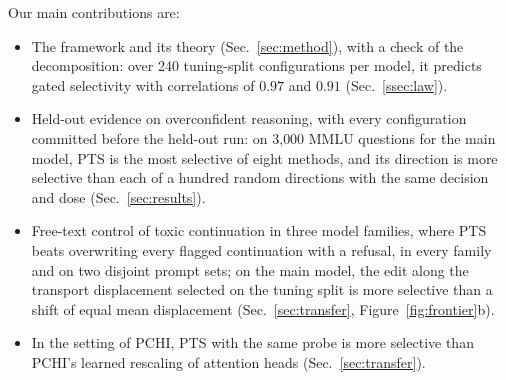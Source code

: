 \documentclass{article}
\begin{document}
Our main contributions are:
\begin{itemize}\setlength{\itemsep}{1pt}
\item The framework and its theory (Sec.~\ref{sec:method}), with a check of
the decomposition: over 240 tuning-split configurations per model, it predicts
gated selectivity with correlations of $0.97$ and $0.91$
(Sec.~\ref{ssec:law}).
\item Held-out evidence on overconfident reasoning, with every configuration
committed before the held-out run: on 3{,}000 MMLU questions for the main model,
PTS is the most selective of eight methods, and its direction is more selective
than each of a hundred random directions with the same decision and dose
(Sec.~\ref{sec:results}).
\item Free-text control of toxic continuation in three model families, where
PTS beats overwriting every flagged continuation with a refusal, in every
family and on two disjoint prompt sets; on the main model, the edit along the
transport displacement selected on the tuning split is more selective than a
shift of equal mean displacement (Sec.~\ref{sec:transfer},
Figure~\ref{fig:frontier}b).
\item In the setting of PCHI, PTS with the same probe is more selective than
PCHI's learned rescaling of attention heads
(Sec.~\ref{sec:transfer}).
\end{itemize}
\end{document}
